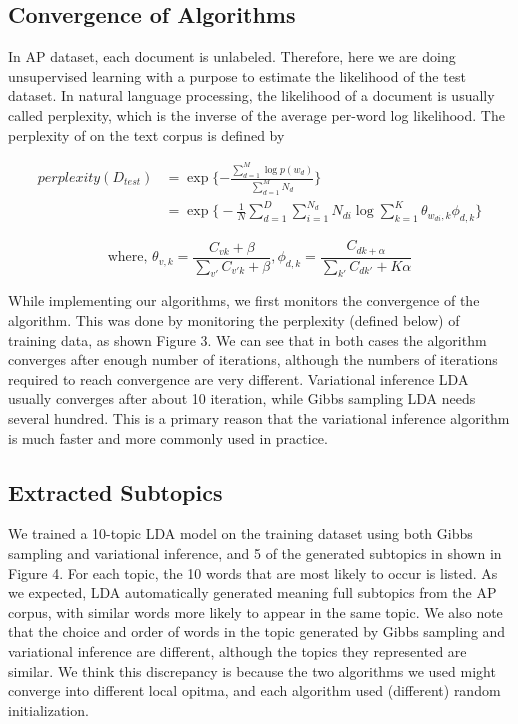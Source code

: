 \documentclass{article} %
\begin{document}
\subsection{Convergence of Algorithms}
In AP dataset, each document is unlabeled. Therefore, here we are doing unsupervised learning with a purpose to estimate the likelihood of the test dataset. In natural language processing, the likelihood of a document is usually called perplexity, which is the inverse of the average per-word log likelihood. The perplexity of on the text corpus is defined by

\begin{align*}
perplexity(D_{test}) &= \exp\Big\{{-\frac{\sum_{d=1}^{M} \log{p(w_d)}}{\sum_{d=1}^{M}N_d}}\Big\}\\
& = \exp \Big\{ -\frac{1}{N}\sum_{d=1}^{D}\sum_{i=1}^{N_d}N_{di}\log \sum_{k=1}^{K}\theta_{w_{di}, k}\phi_{d,k} \Big\}
\end{align*}

$$\text{where, }\theta_{v,k} = \frac{C_{vk}+\beta}{\sum_{v'}C_{v' k}+\beta}, \phi_{d,k} = \frac{C_{dk+\alpha}}{\sum_{k'}C_{dk'}+K\alpha}$$


While implementing our algorithms, we first monitors the convergence of the algorithm. This was done by monitoring the perplexity (defined below) of training data, as shown Figure 3. We can see that in both cases the algorithm converges after enough number of iterations, although the numbers of iterations required to reach convergence are very different. Variational inference LDA usually converges after about 10 iteration, while Gibbs sampling LDA needs several hundred. This is a primary reason that the variational inference algorithm is much faster and more commonly used in practice.

\subsection{Extracted Subtopics}
We trained a 10-topic LDA model on the training dataset using both Gibbs sampling and variational inference, and 5 of the generated subtopics in shown in Figure 4. For each topic, the 10 words that are most likely to occur is listed. As we expected, LDA automatically generated meaning full subtopics from the AP corpus, with similar words more likely to appear in the same topic. We also note that the choice and order of words in the topic generated by Gibbs sampling and variational inference are different, although the topics they represented are similar. We think this discrepancy is because the two algorithms we used might converge into different local opitma, and each algorithm used (different) random initialization.
\end{document}
